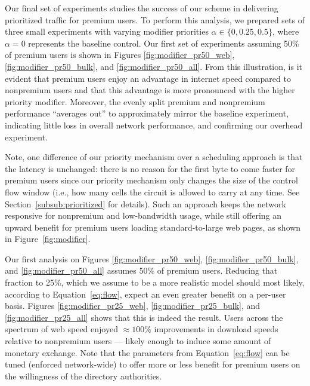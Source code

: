 Our final set of experiments studies the success of our scheme in delivering
prioritized traffic for premium users. To perform this analysis, we prepared
sets of three small experiments with varying modifier priorities
$\alpha \in \{0, 0.25, 0.5\}$, where $\alpha = 0$ represents the baseline
control. Our first set of experiments assuming 50\% of premium users is shown in
Figures \ref{fig:modifier_pr50_web}, \ref{fig:modifier_pr50_bulk}, and
\ref{fig:modifier_pr50_all}. From this illustration, is it evident that premium
users enjoy an advantage in internet speed compared to nonpremium users and that
this advantage is more pronounced with the higher priority modifier. Moreover,
the evenly split premium and nonpremium performance ``averages out'' to
approximately mirror the baseline experiment, indicating little loss in overall
network performance, and confirming our overhead experiment.

Note, one difference of our priority mechanism over a scheduling approach is
that the latency is unchanged: there is no reason for the first byte to come
faster for premium users since our priority mechanism only changes the size of
the control flow window (i.e., how many cells the circuit is allowed to carry at
any time. See Section~\ref{subsub:prioritized} for details). Such an approach
keeps the network responsive for nonpremium and low-bandwidth usage, while still
offering an upward benefit for premium users loading standard-to-large web pages, as shown
in Figure~\ref{fig:modifier}.

Our first analysis on Figures \ref{fig:modifier_pr50_web}, \ref{fig:modifier_pr50_bulk}, and
\ref{fig:modifier_pr50_all} assumes 50\% of premium users. Reducing that fraction to 25\%, which we assume to be a more realistic model should most likely, according to
Equation~\ref{eq:flow}, expect an even greater benefit on a per-user
basis. Figures \ref{fig:modifier_pr25_web}, \ref{fig:modifier_pr25_bulk}, and
\ref{fig:modifier_pr25_all} shows that this is indeed the result. Users across
the spectrum of web speed enjoyed $\approx 100\%$ improvements in download
speeds relative to nonpremium users --- likely enough to induce some amount of
monetary exchange. Note that the parameters from Equation~\ref{eq:flow} can be tuned (enforced network-wide) to offer more or less benefit for premium users on the willingness of the directory authorities.


